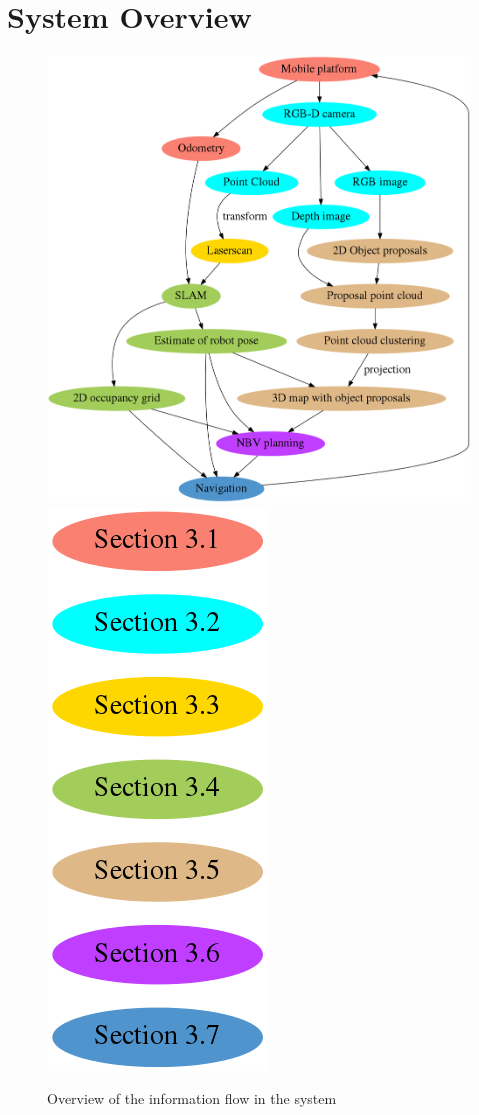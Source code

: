 
\section{System Overview} %
\label{sec:system_overview}

\begin{figure}[ht]
	\begin{center}
		\includegraphics[width=0.82\linewidth]{dot/overview.png} 
		\includegraphics[width=0.17\linewidth]{dot/legend.png} 
		\caption{Overview of the information flow in the system}
		\label{fig:overview}
	\end{center}
\end{figure}

